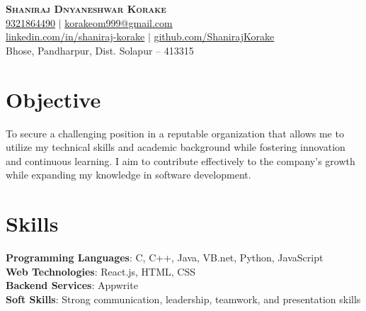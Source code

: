 \documentclass[a4paper,11pt]{article}
\begin{document}
\begin{center}
    \textbf{\Huge \scshape Shaniraj Dnyaneshwar Korake} \\ \vspace{3pt}
    \small
    \faMobile \hspace{.5pt} \href{tel:9321864490}{9321864490} $|$ 
    \faAt \hspace{.5pt} \href{mailto:korakeom999@gmail.com}{korakeom999@gmail.com} \\
    \faLinkedin \hspace{.5pt} \href{https://www.linkedin.com/in/shaniraj-korake/}{linkedin.com/in/shaniraj-korake} $|$
    \faGithub \hspace{.5pt} \href{https://github.com/ShanirajKorake}{github.com/ShanirajKorake} \\
    \faMapMarker \hspace{.5pt} Bhose, Pandharpur, Dist. Solapur – 413315
\end{center}

\section{Objective}
To secure a challenging position in a reputable organization that allows me to utilize my technical skills and academic background while fostering innovation and continuous learning. I aim to contribute effectively to the company's growth while expanding my knowledge in software development.

\section{Skills}
\begin{itemize}[leftmargin=0.15in, label={}]
    \small{\item{
    \textbf{Programming Languages}{: C, C++, Java, VB.net, Python, JavaScript} \\
    \textbf{Web Technologies}{: React.js, HTML, CSS} \\
    \textbf{Backend Services}{: Appwrite} \\
    \textbf{Soft Skills}{: Strong communication, leadership, teamwork, and presentation skills}
    }}
\end{itemize}

\end{document}
